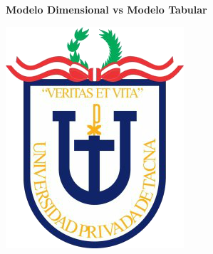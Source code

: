 \documentclass[11pt,a4paper]{article}
\begin{document}
	
	\begin{center}
		\huge \textbf{Modelo Dimensional vs Modelo Tabular} 
	\end{center}
	\vspace{\baselineskip}
	\begin{center}
		\includegraphics[scale=0.37]{./Imagenes/logo}
	\end{center}
	\vspace{\baselineskip}
\end{document}
